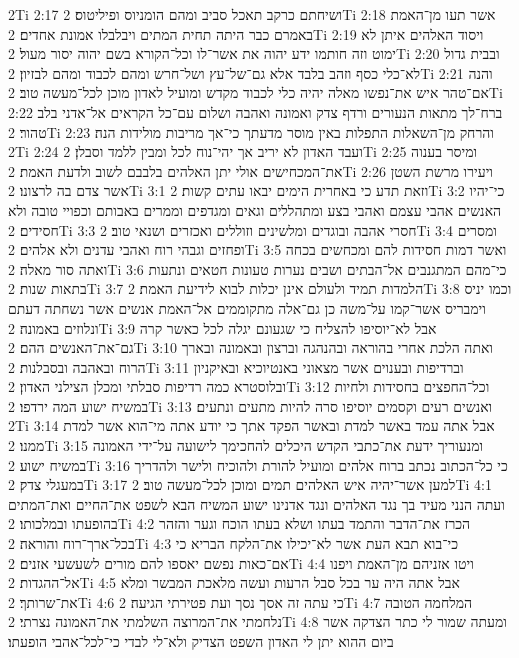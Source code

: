 2Ti 2:17  ושיחתם כרקב תאכל סביב ומהם הומניוס ופיליטוס׃
2Ti 2:18  אשר תעו מן־האמת באמרם כבר היתה תחית המתים ויבלבלו אמונת אחדים׃
2Ti 2:19  ויסוד האלהים איתן לא ימוט וזה חותמו ידע יהוה את אשר־לו וכל־הקורא בשם יהוה יסור מעול׃
2Ti 2:20  ובבית גדול לא־כלי כסף וזהב בלבד אלא גם־של־עץ ושל־חרש ומהם לכבוד ומהם לבזיון׃
2Ti 2:21  והנה אם־טהר איש את־נפשו מאלה יהיה כלי לכבוד מקדש ומועיל לאדון מוכן לכל־מעשה טוב׃
2Ti 2:22  ברח־לך מתאות הנעורים ורדף צדק ואמונה ואהבה ושלום עם־כל הקראים אל־אדני בלב טהור׃
2Ti 2:23  והרחק מן־השאלות התפלות באין מוסר מדעתך כי־אך מריבות מולידות הנה׃
2Ti 2:24  ועבד האדון לא יריב אך יהי־נוח לכל ומבין ללמד וסבלן׃
2Ti 2:25  ומיסר בענוה את־המכחישים אולי יתן האלהים בלבבם לשוב ולדעת האמת׃
2Ti 2:26  ויעירו מרשת השטן אשר צדם בה לרצונו׃
2Ti 3:1  וזאת תדע כי באחרית הימים יבאו עתים קשות׃
2Ti 3:2  כי־יהיו האנשים אהבי עצמם ואהבי בצע ומתהללים וגאים ומגדפים וממרים באבותם וכפויי טובה ולא חסידים׃
2Ti 3:3  חסרי אהבה ובוגדים ומלשינים וזוללים ואכזרים ושנאי טוב׃
2Ti 3:4  ומסרים ופחזים וגבהי רוח ואהבי עדנים ולא אלהים׃
2Ti 3:5  ואשר דמות חסידות להם ומכחשים בכחה ואתה סור מאלה׃
2Ti 3:6  כי־מהם המתגנבים אל־הבתים ושבים נערות טעונות חטאים ונתעות בתאות שנות׃
2Ti 3:7  הלמדות תמיד ולעולם אינן יכלות לבוא לידיעת האמת׃
2Ti 3:8  וכמו יניס וימבריס אשר־קמו על־משה כן גם־אלה מתקוממים אל־האמת אנשים אשר נשחתה דעתם ונלוזים באמונה׃
2Ti 3:9  אבל לא־יוסיפו להצליח כי שגעונם יגלה לכל כאשר קרה גם־את־האנשים ההם׃
2Ti 3:10  ואתה הלכת אחרי בהוראה ובהנהגה וברצון ובאמונה ובארך הרוח ובאהבה ובסבלנות׃
2Ti 3:11  וברדיפות ובענוים אשר מצאוני באנטיוכיא ובאיקניון ובלוסטרא כמה רדיפות סבלתי ומכלן הצילני האדון׃
2Ti 3:12  וכל־החפצים בחסידות ולחיות במשיח ישוע המה ירדפו׃
2Ti 3:13  ואנשים רעים וקסמים יוסיפו סרה להיות מתעים ונתעים׃
2Ti 3:14  אבל אתה עמד באשר למדת ובאשר הפקד אתך כי יודע אתה מי־הוא אשר למדת ממנו׃
2Ti 3:15  ומנעוריך ידעת את־כתבי הקדש היכלים להחכימך לישועה על־ידי האמונה במשיח ישוע׃
2Ti 3:16  כי כל־הכתוב נכתב ברוח אלהים ומועיל להורת ולהוכיח ולישר ולהדריך במעגלי צדק׃
2Ti 3:17  למען אשר־יהיה איש האלהים תמים ומוכן לכל־מעשה טוב׃
2Ti 4:1  ועתה הנני מעיד בך נגד האלהים ונגד אדנינו ישוע המשיח הבא לשפט את־החיים ואת־המתים בהופעתו ובמלכותו׃
2Ti 4:2  הכרז את־הדבר והתמד בעתו ושלא בעתו הוכח וגער והזהר בכל־ארך־רוח והוראה׃
2Ti 4:3  כי־בוא תבא העת אשר לא־יכילו את־הלקח הבריא כי אם־כאות נפשם יאספו להם מורים לשעשעי אזנים׃
2Ti 4:4  ויטו אזניהם מן־האמת ויפנו אל־ההגדות׃
2Ti 4:5  אבל אתה היה ער בכל סבל הרעות ועשה מלאכת המבשר ומלא את־שרותך׃
2Ti 4:6  כי עתה זה אסך נסך ועת פטירתי הגיעה׃
2Ti 4:7  המלחמה הטובה נלחמתי את־המרוצה השלמתי את־האמונה נצרתי׃
2Ti 4:8  ומעתה שמור לי כתר הצדקה אשר ביום ההוא יתן לי האדון השפט הצדיק ולא־לי לבדי כי־לכל־אהבי הופעתו׃
